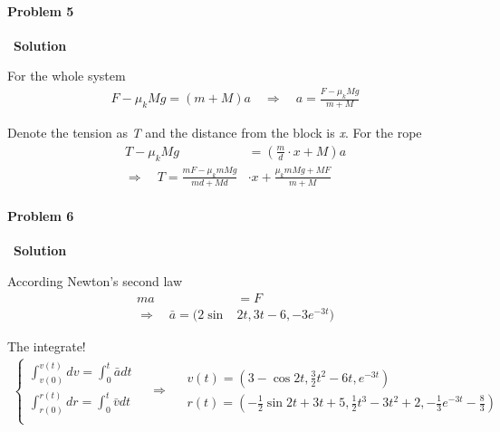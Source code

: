 \documentclass[12pt,a4paper]{article}
\begin{document}
\paragraph{\large \textbf{Problem 5}}~{\textbf{Solution}}
\vspace{2mm}
\par For the whole system
\begin{align*}
	F - \mu_kMg = (m+M) a\quad\Rightarrow\quad a = \frac{F - \mu_kMg}{m+M}
\end{align*}
\par Denote the tension as \textit{T} and the distance from the block is \textit{x}. For the rope
\begin{align*}
	T - \mu_kMg &= (\frac{m}{d}\cdot x + M) a\\
	\Rightarrow \quad T = \frac{mF - \mu_kmMg}{md + Md} &\cdot x + \frac{\mu_kmMg + MF}{m + M}
\end{align*}

\paragraph{\large \textbf{Problem 6}}~{\textbf{Solution}}
\vspace{2mm}
\par According Newton's second law
\begin{align*}
	ma &= F\\
\Rightarrow\quad \bar{a} = (2\sin&2t, 3t-6, -3e^{-3t})
\end{align*}
\par The integrate!
\begin{align*}
\left\{ \begin{array}{c}
		\int_{v(0)}^{v(t)}dv = \int_0^t\bar{a} dt\\
		\int_{r(0)}^{r(t)}dr = \int_0^t\bar{v} dt\\
	\end{array} \right.	
	\quad \Rightarrow \quad	
	\begin{array}{c}
		v(t) = (3-\cos2t, \frac{3}{2}t^2-6t, e^{-3t})\\
		r(t) = (-\frac{1}{2}\sin2t+3t+5, \frac{1}{2}t^3-3t^2+2, -\frac{1}{3}e^{-3t}-\frac{8}{3})
	\end{array}		
\end{align*}
\end{document}
